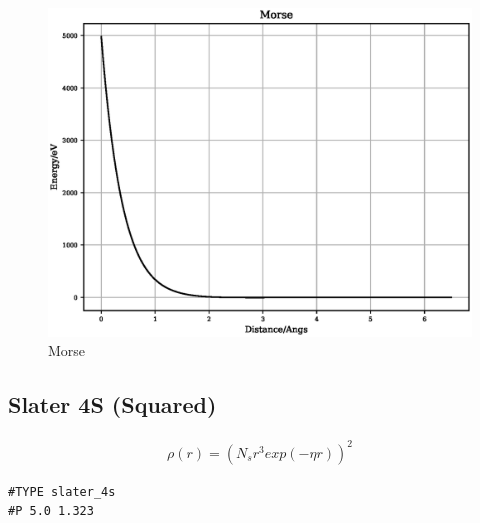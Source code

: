 \documentclass[12pt,twoside]{manual}
\begin{document}
\begin{appendices}
\FloatBarrier
\begin{figure}[h]
  \begin{center}
    \includegraphics[scale=0.5]{img/plots/morse.eps}
    \caption{Morse}
    \label{graph:graph1}
  \end{center}
\end{figure}
\FloatBarrier







\subsection{Slater 4S (Squared)}

\begin{equation}
\begin{split}
\rho(r) = (N_s r^3 exp(-\eta r))^2 
\end{split}
\label{eq:slater4S}
\end{equation}

\begin{lstlisting}[style=pseudocode,caption={Slater 4S}]
#TYPE slater_4s
#P 5.0 1.323
\end{lstlisting}


\end{appendices}
\end{document}
